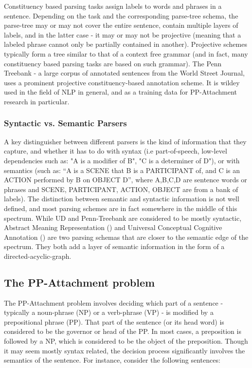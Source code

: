 Constituency based parsing tasks assign labels to words and phrases in a sentence. Depending on the task and the corresponding parse-tree schema, the parse-tree may or may not cover the entire sentence, contain multiple layers of labels, and in the latter case - it may or may not be projective (meaning that a labeled phrase cannot only be partially contained in another). Projective schemes typically form a tree similar to that of a context free grammar (and in fact, many constituency based parsing tasks are based on such grammar). The Penn Treebank - a large corpus of annotated sentences from the World Street Journal, uses a prominent projective constituency-based annotation scheme. It is wildey used in the field of NLP in general, and as a training data for PP-Attachment research in particular.

\subsubsection{Syntactic vs. Semantic Parsers}

A key distinguisher between different parsers is the kind of information that they capture, and whether it has to do with syntax (i.e part-of-speech, low-level dependencies such as: "A is a modifier of B", "C is a determiner of D"), or with semantics (such as: “A is a SCENE that B is a PARTICIPANT of, and C is an ACTION performed by B on OBJECT D”, where A,B,C,D are sentence words or phrases and SCENE, PARTICIPANT, ACTION, OBJECT are from a bank of labels). The distinction between semantic and syntactic information is not well defined, and most parsing schemes are in fact somewhere in the middle of this spectrum. While UD and Penn-Treebank are considered to be mostly syntactic, Abstract Meaning Representation (\cite{amr}) and Universal Conceptual Cognitive Annotation (\cite{ucca}) are two parsing schemas that are closer to the semantic edge of the spectrum. They both add a layer of semantic information in the form of a directed-acyclic-graph. 

\subsection{The PP-Attachment problem}

The PP-Attachment problem involves deciding which part of a sentence  - typically a noun-phrase (NP) or a verb-phrase (VP) - is modified by a prepositional phrase (PP). That part of the sentence (or its head word) is considered to be the governor or head of the PP. In most cases, a preposition is followed by a NP, which is considered to be the object of the preposition. Though it may seem mostly syntax related, the decision process significantly involves the semantics of the sentence. For instance, consider the following sentences:

